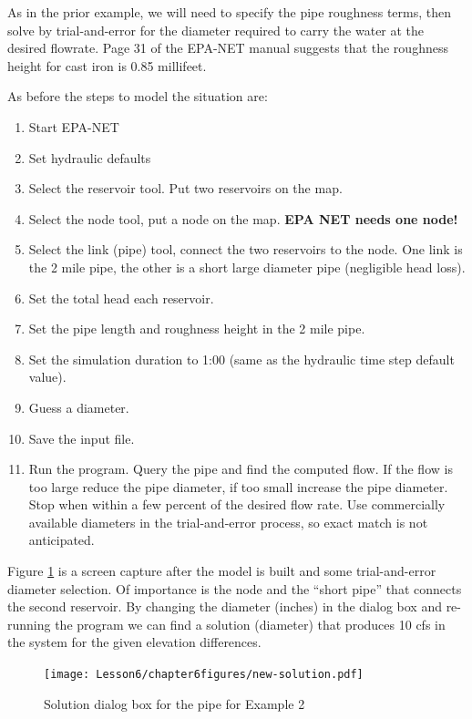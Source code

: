 As in the prior example, we will need to specify the pipe roughness terms, then solve by trial-and-error for the diameter required to carry the water at the desired flowrate.  Page 31 of the EPA-NET manual suggests that the roughness height for cast iron is 0.85 millifeet.  

As before the steps to model the situation are:
\begin{enumerate}
\item Start EPA-NET
\item Set hydraulic defaults
\item Select the reservoir tool.  Put two reservoirs on the map.
\item Select the node tool, put a node on the map. \textbf{EPA NET needs one node!}
\item Select the link (pipe) tool, connect the two reservoirs to the node.  One link is the 2 mile pipe, the other is a short large diameter pipe (negligible head loss).
\item Set the total head each reservoir.
\item Set the pipe length and roughness height in the 2 mile pipe.
\item Set the simulation duration to 1:00 (same as the hydraulic time step default value).
\item Guess a diameter.
\item Save the input file.
\item Run the program.   Query the pipe and find the computed flow.  If the flow is too large reduce the pipe diameter, if too small increase the pipe diameter.  Stop when within a few percent of the desired flow rate.  Use commercially available diameters in the trial-and-error process, so exact match is not anticipated.
\end{enumerate}

Figure \ref{fig:new-solution} is a screen capture after the model is built and some trial-and-error diameter selection.   Of importance is the node and the ``short pipe'' that connects the second reservoir.   By changing the diameter (inches) in the dialog box and re-running the program we can find a solution (diameter) that produces 10 cfs in the system for the given elevation differences.  

\begin{figure}[h!] %
   \centering
   \texttt{[image: Lesson6/chapter6figures/new-solution.pdf]} 
   \caption{Solution dialog box for the pipe for Example 2}
   \label{fig:new-solution}
\end{figure}

